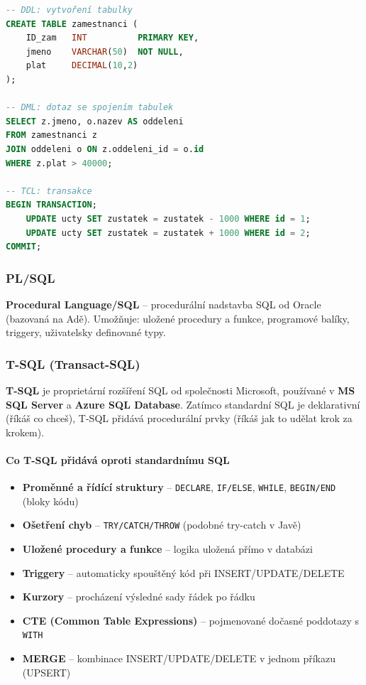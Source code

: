 \begin{lstlisting}[language=SQL, caption=Příklady SQL příkazů]
-- DDL: vytvoření tabulky
CREATE TABLE zamestnanci (
    ID_zam   INT          PRIMARY KEY,
    jmeno    VARCHAR(50)  NOT NULL,
    plat     DECIMAL(10,2)
);

-- DML: dotaz se spojením tabulek
SELECT z.jmeno, o.nazev AS oddeleni
FROM zamestnanci z
JOIN oddeleni o ON z.oddeleni_id = o.id
WHERE z.plat > 40000;

-- TCL: transakce
BEGIN TRANSACTION;
    UPDATE ucty SET zustatek = zustatek - 1000 WHERE id = 1;
    UPDATE ucty SET zustatek = zustatek + 1000 WHERE id = 2;
COMMIT;
\end{lstlisting}

\subsubsection{PL/SQL}

\textbf{Procedural Language/SQL} -- procedurální nadstavba SQL od Oracle (bazovaná na Adě). Umožňuje:
uložené procedury a funkce, programové balíky, triggery, uživatelsky definované typy.

\subsubsection{T-SQL (Transact-SQL)}

\textbf{T-SQL} je proprietární rozšíření SQL od společnosti Microsoft, používané v \textbf{MS SQL Server}
a \textbf{Azure SQL Database}. Zatímco standardní SQL je deklarativní (říkáš co chceš),
T-SQL přidává procedurální prvky (říkáš jak to udělat krok za krokem).

\paragraph{Co T-SQL přidává oproti standardnímu SQL}
\begin{itemize}
  \item \textbf{Proměnné a řídící struktury} -- \texttt{DECLARE}, \texttt{IF/ELSE}, \texttt{WHILE},
    \texttt{BEGIN/END} (bloky kódu)
  \item \textbf{Ošetření chyb} -- \texttt{TRY/CATCH/THROW} (podobné try-catch v Javě)
  \item \textbf{Uložené procedury a funkce} -- logika uložená přímo v databázi
  \item \textbf{Triggery} -- automaticky spouštěný kód při INSERT/UPDATE/DELETE
  \item \textbf{Kurzory} -- procházení výsledné sady řádek po řádku
  \item \textbf{CTE (Common Table Expressions)} -- pojmenované dočasné poddotazy s \texttt{WITH}
  \item \textbf{MERGE} -- kombinace INSERT/UPDATE/DELETE v jednom příkazu (UPSERT)
\end{itemize}

